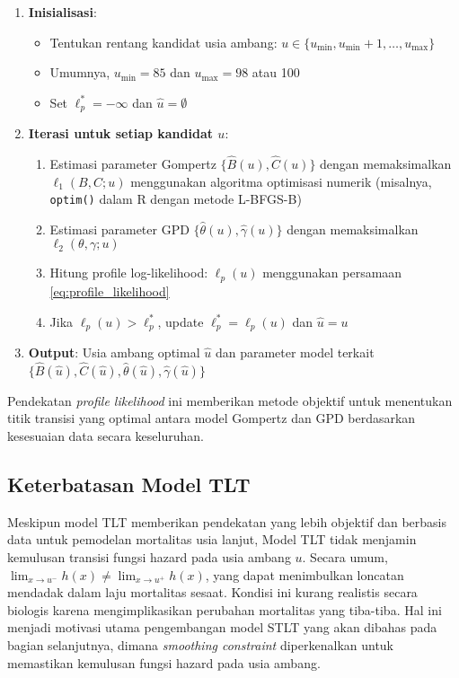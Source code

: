 \begin{enumerate}
    \item \textbf{Inisialisasi}:
    \begin{itemize}
        \item Tentukan rentang kandidat usia ambang: $u \in \{u_{\min}, u_{\min} + 1, \ldots, u_{\max}\}$
        \item Umumnya, $u_{\min} = 85$ dan $u_{\max} = 98$ atau 100
        \item Set $\ell_p^* = -\infty$ dan $\hat{u} = \emptyset$
    \end{itemize}
    
    \item \textbf{Iterasi untuk setiap kandidat $u$}:
    \begin{enumerate}
        \item Estimasi parameter Gompertz $\{\hat{B}(u), \hat{C}(u)\}$ dengan memaksimalkan $\ell_1(B, C; u)$ menggunakan algoritma optimisasi numerik (misalnya, \texttt{optim()} dalam R dengan metode L-BFGS-B)
        
        \item Estimasi parameter GPD $\{\hat{\theta}(u), \hat{\gamma}(u)\}$ dengan memaksimalkan $\ell_2(\theta, \gamma; u)$
        
        \item Hitung profile log-likelihood: $\ell_p(u)$ menggunakan persamaan \eqref{eq:profile_likelihood}
        
        \item Jika $\ell_p(u) > \ell_p^*$, update $\ell_p^* = \ell_p(u)$ dan $\hat{u} = u$
    \end{enumerate}
    
    \item \textbf{Output}: Usia ambang optimal $\hat{u}$ dan parameter model terkait $\{\hat{B}(\hat{u}), \hat{C}(\hat{u}), \hat{\theta}(\hat{u}), \hat{\gamma}(\hat{u})\}$
\end{enumerate}

Pendekatan \textit{profile likelihood} ini memberikan metode objektif untuk menentukan titik transisi yang optimal antara model Gompertz dan GPD berdasarkan kesesuaian data secara keseluruhan.

\subsection{Keterbatasan Model TLT}

Meskipun model TLT memberikan pendekatan yang lebih objektif dan berbasis data untuk pemodelan mortalitas usia lanjut, Model TLT tidak menjamin kemulusan transisi fungsi hazard pada usia ambang $u$. Secara umum, $\lim_{x \to u^-} h(x) \neq \lim_{x \to u^+} h(x)$, yang dapat menimbulkan loncatan mendadak dalam laju mortalitas sesaat. Kondisi ini kurang realistis secara biologis karena mengimplikasikan perubahan mortalitas yang tiba-tiba. Hal ini menjadi motivasi utama pengembangan model STLT yang akan dibahas pada bagian selanjutnya, dimana \textit{smoothing constraint} diperkenalkan untuk memastikan kemulusan fungsi hazard pada usia ambang.

